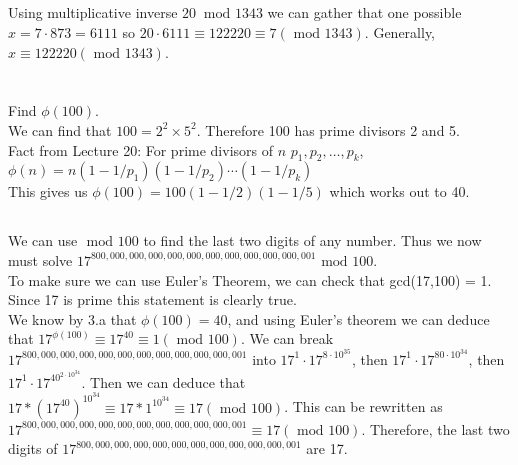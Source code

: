 \documentclass{article}
\renewcommand{\mod}{\text{ mod }}
\begin{document}
\subsection{}
Using multiplicative inverse $20 \ \mod 1343$ we can gather that one possible $x= 7\cdot 873 = 6111$ so $20 \cdot 6111 \equiv 122220 \equiv 7(\mod 1343)$. Generally, $x \equiv 122220 (\mod 1343)$.


\section{}
\subsection{}
Find $\phi(100)$.\\
We can find that $100 = 2^2 \times 5^2$. Therefore 100 has prime divisors 2 and 5.\\
Fact from Lecture 20: For prime divisors of $n$ $p_1,p_2,\dots,p_k$, $\phi(n) = n(1-1/p_1)(1-1/p_2)\cdots(1-1/p_k)$\\
This gives us $\phi(100) = 100(1-1/2)(1-1/5)$ which works out to 40.

\subsection{}
We can use $\mod 100$ to find the last two digits of any number. Thus we now must solve $17^{800,000,000,000,000,000,000,000,000,000,000,001} \mod 100$. \\
To make sure we can use Euler's Theorem, we can check that gcd(17,100) = 1. Since 17 is prime this statement is clearly true.\\
We know by 3.a that $\phi(100)=40$, and using Euler's theorem we can deduce that $17^{\phi(100)} \equiv 17^{40} \equiv 1 (\mod 100)$. We can break $17^{800,000,000,000,000,000,000,000,000,000,000,001}$ into 
$17^1 \cdot 17^{8 \cdot 10^{35}}$, then 
$17^1 \cdot 17^{80 \cdot 10^{34}}$, then 
$17^1 \cdot 17^{40^{2 \cdot 10^{34}}}$.
Then we can deduce that $17 * (17^{40})^{10^{34}} \equiv 17 * 1^{10^{34}} \equiv 17 (\mod 100)$. This can be rewritten as $17^{800,000,000,000,000,000,000,000,000,000,000,001} \equiv 17 (\mod 100)$. Therefore, the last two digits of $17^{800,000,000,000,000,000,000,000,000,000,000,001}$ are 17.
\end{document}
